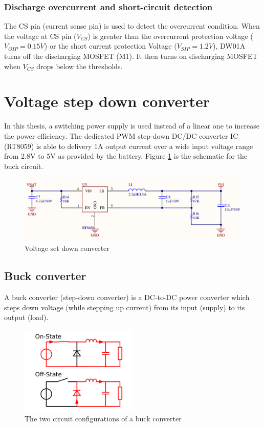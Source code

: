 \documentclass[\main/main.tex]{subfiles}
\begin{document}
\subsubsection{Discharge overcurrent and short-circuit detection}
The CS pin (current sense pin) is used to detect the overcurrent condition. When the voltage at CS pin ($V_{CS}$) is greater than the overcurrent protection voltage ($V_{OIP} = 0.15V$) or the short current protection Voltage ($V_{SIP} = 1.2V$), DW01A turns off the discharging MOSFET (M1). It then turns on discharging MOSFET when $V_{CS}$ drops below the thresholds.

\section{Voltage step down converter}
In this thesis, a switching power supply is used instead of a linear one to increase the power efficiency. The dedicated PWM step-down DC/DC converter IC (RT8059) is able to delivery 1A output current over a wide input voltage range from 2.8V to 5V as provided by the battery. Figure \ref{fig:voltage_set_down_converter} is the schematic for the buck circuit.
\begin{figure}[H]
    \begin{center}
        \includegraphics[width=1\textwidth]{voltage_set_down_converter.png}
    \end{center}
    \caption{Voltage set down converter}
    \label{fig:voltage_set_down_converter}
\end{figure}
\subsection{Buck converter}
A buck converter (step-down converter) is a DC-to-DC power converter which steps down voltage (while stepping up current) from its input (supply) to its output (load).

\begin{figure}[H]
    \begin{center}
        \includegraphics[width=0.5\textwidth]{buck_converter.png}
    \end{center}
    \caption{The two circuit configurations of a buck converter}
    \label{fig:buck_converter}
\end{figure}
\end{document}
